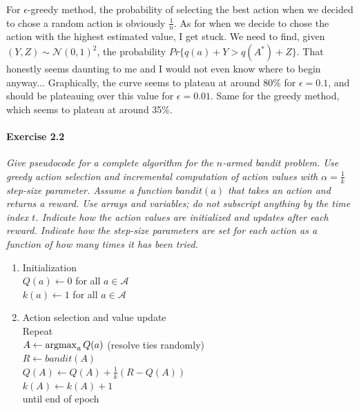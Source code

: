For $\epsilon$-greedy method, the probability of selecting the best action when we decided to chose a random action is obviously $\frac{1}{n}$.
As for when we decide to chose the action with the highest estimated value, I get stuck.
We need to find, given $(Y, Z) \sim \mathcal{N}(0,1)^2$, the probability $Pr\{q(a) + Y > q(A^*) + Z\}$.
That honestly seems daunting to me and I would not even know where to begin anyway...
Graphically, the curve seems to plateau at around 80\% for $\epsilon = 0.1$, and should be plateauing over this value for $\epsilon = 0.01$.
Same for the greedy method, which seems to plateau at around 35\%.

\paragraph{Exercise 2.2}
\textit{Give pseudocode for a complete algorithm for the $n$-armed bandit problem. Use greedy action selection and incremental computation of action values with $\alpha = \frac{1}{k}$ step-size parameter. Assume a function $\mathit{bandit}(a)$ that takes an action and returns a reward. Use arrays and variables; do not subscript anything by the time index $t$. Indicate how the action values are initialized and updates after each reward. Indicate how the step-size parameters are set for each action as a function of how many times it has been tried.}

\begin{enumerate}
\item Initialization \\
$Q(a) \leftarrow 0$ for all $a \in \mathcal{A}$ \\
$k(a) \leftarrow 1$ for all $a \in \mathcal{A}$

\item Action selection and value update \\
Repeat \\
\-\hspace{2em} $A \leftarrow \operatorname*{argmax}_a Q(a)$ (resolve ties randomly) \\
\-\hspace{2em} $R \leftarrow \mathit{bandit}(A)$ \\
\-\hspace{2em} $Q(A) \leftarrow Q(A) + \frac{1}{k} (R - Q(A))$ \\
\-\hspace{2em} $k(A) \leftarrow k(A) + 1$ \\
until end of epoch
\end{enumerate}

